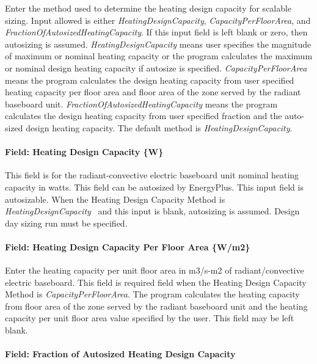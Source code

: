 Enter the method used to determine the heating design capacity for scalable sizing. Input allowed is either \emph{HeatingDesignCapacity}, \emph{CapacityPerFloorArea}, and \emph{FractionOfAutosizedHeatingCapacity}. If this input field is left blank or zero, then autosizing is assumed. \emph{HeatingDesignCapacity} means user specifies the magnitude of maximum or nominal heating capacity or the program calculates the maximum or nominal design heating capacity if autosize is specified. \emph{CapacityPerFloorArea} means the program calculates the design heating capacity from user specified heating capacity per floor area and floor area of the zone served by the radiant baseboard unit. \emph{FractionOfAutosizedHeatingCapacity} means the program calculates the design heating capacity from user specified fraction and the auto-sized design heating capacity. The default method is \emph{HeatingDesignCapacity}.

\paragraph{Field: Heating Design Capacity \{W\}}\label{field-heating-design-capacity-w-2}

This field is for the radiant-convective electric baseboard unit nominal heating capacity in watts. This field can be autosized by EnergyPlus. This input field is autosizable. When the Heating Design Capacity Method is \emph{HeatingDesignCapacity}~ and this input is blank, autosizing is assumed. Design day sizing run must be specified.

\paragraph{Field: Heating Design Capacity Per Floor Area \{W/m2\}}\label{field-heating-design-capacity-per-floor-area-wm2-2}

Enter the heating capacity per unit floor area in m3/s-m2 of radiant/convective electric baseboard. This field is required field when the Heating Design Capacity Method is \emph{CapacityPerFloorArea}. The program calculates the heating capacity from floor area of the zone served by the radiant baseboard unit and the heating capacity per unit floor area value specified by the user. This field may be left blank.

\paragraph{Field: Fraction of Autosized Heating Design Capacity}\label{field-fraction-of-autosized-heating-design-capacity-2}

